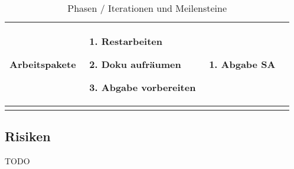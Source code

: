 \begin{landscape}
\begin{longtable}{l p{5.5cm} p{5.5cm} p{5.5cm}}
        \textbf{Arbeitspakete}
                                & \begin{enumerate}[noitemsep]
                                    \item Restarbeiten
                                    \item Doku aufräumen
                                    \item Abgabe vorbereiten
                                \end{enumerate}
                                & \begin{enumerate}[noitemsep]
                                    \item Abgabe SA
                                \end{enumerate}
                                & \\
        
        \bottomrule
    \caption{Phasen / Iterationen und Meilensteine}
    \label{table:Phasen / Iterationen und Meilensteine}
\end{longtable}
\end{landscape}

\subsection{Risiken}
\label{sub:Risiken}

TODO